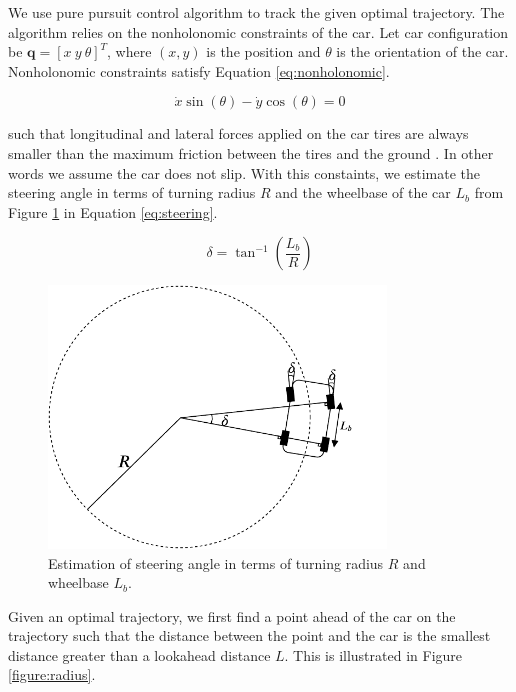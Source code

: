 We use pure pursuit control algorithm to track the given optimal trajectory.
The algorithm relies on the nonholonomic constraints of the car. Let car
configuration be $\textbf{q} = [x\ y\ \theta]^T$, where $(x, y)$ is the position
and $\theta$ is the orientation of the car. Nonholonomic constraints satisfy
Equation \eqref{eq:nonholonomic}.

\begin{equation}
  \dot{x}\sin(\theta) - \dot{y}\cos(\theta) = 0
  \label{eq:nonholonomic}
\end{equation}

such that longitudinal and lateral forces applied on the car tires are always
smaller than the maximum friction between the tires and the ground
\cite{Kim2013SensorbasedMP}.  In other words we assume the car does not slip.
With this constaints, we estimate the steering angle in terms of turning radius
$R$ and the wheelbase of the car $L_b$ from Figure \ref{figure:steering} in
Equation \eqref{eq:steering}.

\begin{equation}
  \delta = \tan^{-1}(\frac{L_b}{R})
  \label{eq:steering}
\end{equation}

\begin{figure}[h]
  \centering
  \includegraphics[width=0.8\textwidth]{figures/pure-pursuit-steering.pdf}
  \caption[Steering angle geometry in pure pursuit controller]{Estimation of
    steering angle in terms of turning radius $R$ and wheelbase $L_b$.}
  \label{figure:steering}
\end{figure}

Given an optimal trajectory, we first find a point ahead of the car on the
trajectory such that the distance between the point and the car is the smallest
distance greater than a lookahead distance $L$. This is illustrated in Figure
\ref{figure:radius}.

